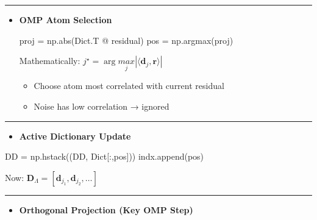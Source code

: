 \documentclass[11pt]{article}
\providecommand{\tightlist}{%
      \setlength{\itemsep}{0pt}\setlength{\parskip}{0pt}}
\newenvironment{Shaded}{}{}
\newcommand{\NormalTok}[1]{{#1}}
\newcommand{\OperatorTok}[1]{\textcolor[rgb]{0.40,0.40,0.40}{{#1}}}
\newcommand{\BuiltInTok}[1]{{#1}}
\begin{document}
\begin{center}\rule{0.5\linewidth}{0.5pt}\end{center}

\begin{itemize}
\item
  \textbf{OMP Atom Selection}

\begin{Shaded}
\begin{Highlighting}[]
\NormalTok{proj }\OperatorTok{=}\NormalTok{ np.}\BuiltInTok{abs}\NormalTok{(Dict.T }\OperatorTok{@}\NormalTok{ residual)}
\NormalTok{pos }\OperatorTok{=}\NormalTok{ np.argmax(proj)}
\end{Highlighting}
\end{Shaded}

  Mathematically:
  \(j^\star = \arg\underset{j}{max} |\langle \mathbf{d}_j, \mathbf{r} \rangle|\)

  \begin{itemize}
  \tightlist
  \item
    Choose atom most correlated with current residual
  \item
    Noise has low correlation → ignored
  \end{itemize}
\end{itemize}

\begin{center}\rule{0.5\linewidth}{0.5pt}\end{center}

\begin{itemize}
\tightlist
\item
  \textbf{Active Dictionary Update}
\end{itemize}

\begin{Shaded}
\begin{Highlighting}[]
\NormalTok{DD }\OperatorTok{=}\NormalTok{ np.hstack((DD, Dict[:,pos]))}
\NormalTok{indx.append(pos)}
\end{Highlighting}
\end{Shaded}

Now:
\(\mathbf{D}_{\Lambda} = [\mathbf{d}_{j_1}, \mathbf{d}_{j_2}, \dots]\)

\begin{center}\rule{0.5\linewidth}{0.5pt}\end{center}

\begin{itemize}
\tightlist
\item
  \textbf{Orthogonal Projection (Key OMP Step)}
\end{itemize}
\end{document}
